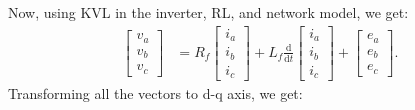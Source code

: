 Now, using KVL in the inverter, RL, and network model, we get:
\begin{align*}
	\begin{bmatrix}
		v_a\\v_b\\v_c
	\end{bmatrix} &= R_f \begin{bmatrix}
		i_a\\i_b\\i_c
	\end{bmatrix} + L_f \frac{\text{d}}{\text{d}t}\begin{bmatrix}
		i_a\\i_b\\i_c
	\end{bmatrix}+\begin{bmatrix}
		e_a\\e_b\\e_c
	\end{bmatrix}.
\end{align*}
Transforming all the vectors to d-q axis, we get:
